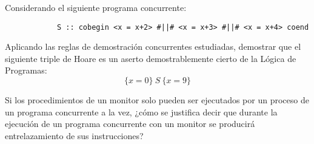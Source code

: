 \documentclass[12pt]{article}
\begin{document}
    \begin{ejercicio}
        Considerando el siguiente programa concurrente:
        \begin{verbatim}
            S :: cobegin <x = x+2> #||# <x = x+3> #||# <x = x+4> coend
        \end{verbatim}
        Aplicando las reglas de demostración concurrentes estudiadas, demostrar que el siguiente triple de Hoare es un aserto demostrablemente cierto de la Lógica de Programas:
        \begin{equation*}
            \{x=0\}\ S\ \{x=9\}
        \end{equation*}
    \end{ejercicio}

    \begin{ejercicio}
        Si los procedimientos de un monitor solo pueden ser ejecutados por un proceso de un programa concurrente a la vez, ¿cómo se justifica decir que durante la ejecución de un programa concurrente con un monitor se producirá entrelazamiento de sus instrucciones?
    \end{ejercicio}
\end{document}
